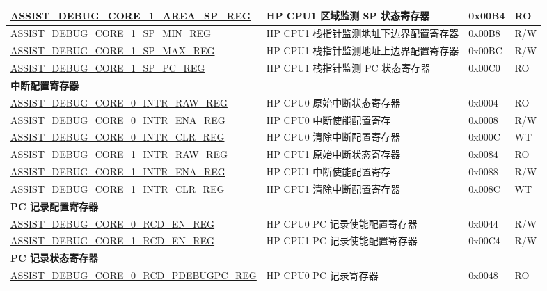 \begin{longtable}{ | p{8.7cm} | m{5cm} | p{1.2cm} | p{0.75cm} | }
\hyperref[regdesc:ASSISTDEBUGCORE1AREASPREG]{ASSIST\_DEBUG\_CORE\_1\_AREA\_SP\_REG} & HP CPU1 区域监测 SP 状态寄存器 & 0x00B4 & RO \\ \hline
\hyperref[regdesc:ASSISTDEBUGCORE1SPMINREG]{ASSIST\_DEBUG\_CORE\_1\_SP\_MIN\_REG} & HP CPU1 栈指针监测地址下边界配置寄存器 & 0x00B8 &R/W \\ \hline
\hyperref[regdesc:ASSISTDEBUGCORE1SPMAXREG]{ASSIST\_DEBUG\_CORE\_1\_SP\_MAX\_REG} & HP CPU1 栈指针监测地址上边界配置寄存器 & 0x00BC &R/W \\ \hline
\hyperref[regdesc:ASSISTDEBUGCORE1SPPCREG]{ASSIST\_DEBUG\_CORE\_1\_SP\_PC\_REG} & HP CPU1 栈指针监测 PC 状态寄存器 & 0x00C0 & RO \\ \hline
\multicolumn{4}{|l|}{\textbf{中断配置寄存器}} \\ \hline
\hyperref[regdesc:ASSISTDEBUGCORE0INTRRAWREG]{ASSIST\_DEBUG\_CORE\_0\_INTR\_RAW\_REG} & HP CPU0 原始中断状态寄存器 & 0x0004 & RO \\ \hline
\hyperref[regdesc:ASSISTDEBUGCORE0INTRENAREG]{ASSIST\_DEBUG\_CORE\_0\_INTR\_ENA\_REG} & HP CPU0 中断使能配置寄存 & 0x0008 & R/W \\ \hline
\hyperref[regdesc:ASSISTDEBUGCORE0INTRCLRREG]{ASSIST\_DEBUG\_CORE\_0\_INTR\_CLR\_REG} & HP CPU0 清除中断配置寄存器 & 0x000C & WT \\ \hline
\hyperref[regdesc:ASSISTDEBUGCORE1INTRRAWREG]{ASSIST\_DEBUG\_CORE\_1\_INTR\_RAW\_REG} & HP CPU1 原始中断状态寄存器 & 0x0084 & RO \\ \hline
\hyperref[regdesc:ASSISTDEBUGCORE1INTRENAREG]{ASSIST\_DEBUG\_CORE\_1\_INTR\_ENA\_REG} & HP CPU1 中断使能配置寄存 & 0x0088 & R/W \\ \hline
\hyperref[regdesc:ASSISTDEBUGCORE1INTRCLRREG]{ASSIST\_DEBUG\_CORE\_1\_INTR\_CLR\_REG} & HP CPU1 清除中断配置寄存器 & 0x008C & WT \\ \hline
\multicolumn{4}{|l|}{\textbf{PC 记录配置寄存器}} \\ \hline
\hyperref[regdesc:ASSISTDEBUGCORE0RCDENREG]{ASSIST\_DEBUG\_CORE\_0\_RCD\_EN\_REG} & HP CPU0 PC 记录使能配置寄存器 & 0x0044 &R/W \\ \hline
\hyperref[regdesc:ASSISTDEBUGCORE1RCDENREG]{ASSIST\_DEBUG\_CORE\_1\_RCD\_EN\_REG} & HP CPU1 PC 记录使能配置寄存器 & 0x00C4 &R/W \\ \hline
\multicolumn{4}{|l|}{\textbf{PC 记录状态寄存器}} \\ \hline
\hyperref[regdesc:ASSISTDEBUGCORE0RCDPDEBUGPCREG]{ASSIST\_DEBUG\_CORE\_0\_RCD\_PDEBUGPC\_REG} & HP CPU0 PC 记录寄存器 & 0x0048 & RO \\ \hline

\end{longtable}
